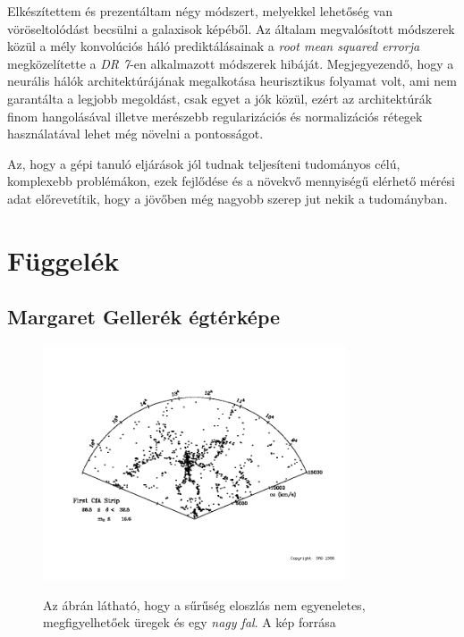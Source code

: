 \documentclass[12pt,letterpaper,oneside,openright]{book}
\begin{document}
Elkészítettem és prezentáltam négy módszert, melyekkel lehetőség van vöröseltolódást becsülni a galaxisok képéből. Az általam megvalósított módszerek közül a mély konvolúciós háló prediktálásainak a \textit{root mean squared errorja} megközelítette a \textit{DR 7}-en alkalmazott módszerek hibáját. Megjegyezendő, hogy a neurális hálók architektúrájának megalkotása heurisztikus folyamat volt, ami nem garantálta a legjobb megoldást, csak egyet a jók közül, ezért az architektúrák finom hangolásával illetve merészebb regularizációs és normalizációs rétegek használatával lehet még növelni a pontosságot. 

Az, hogy a gépi tanuló eljárások jól tudnak teljesíteni tudományos célú, komplexebb problémákon, ezek fejlődése és a növekvő mennyiségű elérhető mérési adat előrevetítik, hogy a jövőben még nagyobb szerep jut nekik a tudományban.
\appendix

\chapter*{Függelék}
\addappheadtotoc
\renewcommand\thesection{A.\arabic{section}}
\section{Margaret Gellerék égtérképe}
\label{MGM}
\begin{figure}[h!]
\centering
\includegraphics[width = 0.8\textwidth]{Figures/MG.png}
\label{imec}
\caption{Az ábrán látható, hogy a sűrűség eloszlás nem egyeneletes, megfigyelhetőek üregek és egy \textit{nagy fal}. A kép forrása \cite{mgim}}
\end{figure}

\renewcommand\thesection{B.\arabic{section}}
\end{document}
